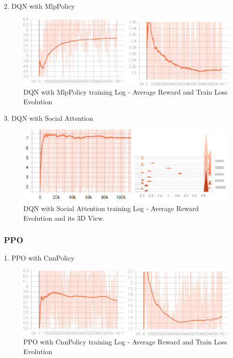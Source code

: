 2. DQN with MlpPolicy

\begin{figure}[H]
    \centering
    \includegraphics[height=0.20\textheight]{images/dqn_mlp.png} 
    \caption{DQN with MlpPolicy training Log - Average Reward and Train Loss Evolution}
\end{figure}

3. DQN with Social Attention

\begin{figure}[H]
    \centering
    \includegraphics[height=0.20\textheight]{images/dqn_sa.png} 
    \caption{DQN with Social Attention training Log - Average Reward Evolution and its 3D View.}
\end{figure}

\subsubsection{PPO}

1. PPO with CnnPolicy

\begin{figure}[H]
    \centering
    \includegraphics[height=0.20\textheight]{images/ppo_cnn.png} 
    \caption{PPO with CnnPolicy training Log - Average Reward and Train Loss Evolution}
\end{figure}



